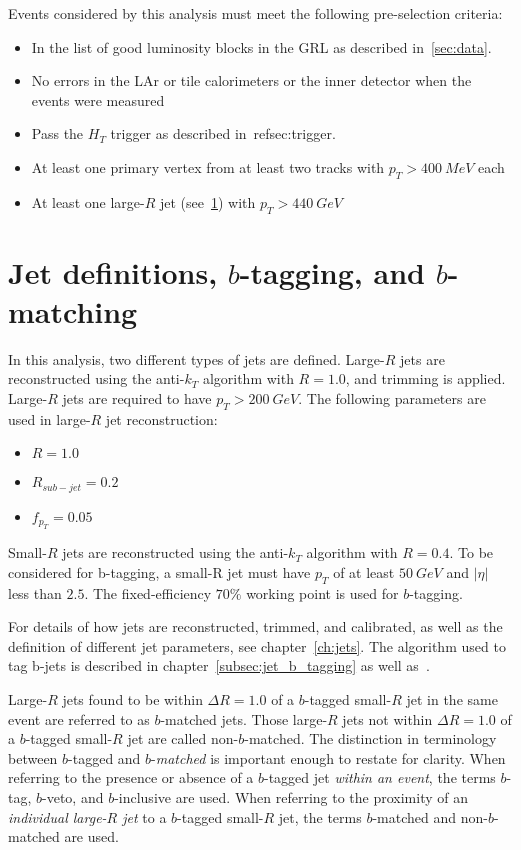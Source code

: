 Events considered by this analysis must meet the following pre-selection criteria:

\begin{itemize}
    \item In the list of good luminosity blocks in the GRL as described in~\ref{sec:data}.
    \item No errors in the LAr or tile calorimeters or the inner detector when the events were measured
    \item Pass the $H_{T}$ trigger as described in~ref{sec:trigger}.
    \item At least one primary vertex from at least two tracks with $p_{T}>400~MeV$ each
    \item At least one large-$R$ jet (see~\ref{sec:jet_definitions}) with $p_{T}>440~GeV$
\end{itemize}

\section{Jet definitions, $b$-tagging, and $b$-matching}\label{sec:jet_definitions}

In this analysis, two different types of jets are defined.
Large-$R$ jets are reconstructed using the anti-$k_{T}$ algorithm with $R=1.0$, and trimming is applied.
Large-$R$ jets are required to have $p_{T}>200~GeV$.
The following parameters are used in large-$R$ jet reconstruction:

\begin{itemize}
    \item $R=1.0$
    \item $R_{sub-jet}=0.2$
    \item $f_{p_{T}}=0.05$
\end{itemize}

Small-$R$ jets are reconstructed using the anti-$k_{T}$ algorithm with $R=0.4$.
To be considered for b-tagging, a small-R jet must have $p_{T}$ of at least $50~GeV$ and $|\eta|$ less than $2.5$.
The fixed-efficiency $70\%$ working point is used for $b$-tagging.

For details of how jets are reconstructed, trimmed, and calibrated, as well as the definition of different jet parameters, see chapter~\ref{ch:jets}.
The algorithm used to tag b-jets is described in chapter~\ref{subsec:jet_b_tagging} as well as~\cite{b-jet-perf-1,b-jet-perf-2}.

Large-$R$ jets found to be within $\Delta R=1.0$ of a $b$-tagged small-$R$ jet in the same event are referred to as $b$-matched jets.
Those large-$R$ jets not within $\Delta R=1.0$ of a $b$-tagged small-$R$ jet are called non-$b$-matched.
The distinction in terminology between $b$-tagged and $b$-\textit{matched} is important enough to restate for clarity.
When referring to the presence or absence of a $b$-tagged jet \textit{within an event}, the terms $b$-tag, $b$-veto, and $b$-inclusive are used.
When referring to the proximity of an \textit{individual large-$R$ jet} to a $b$-tagged small-$R$ jet, the terms $b$-matched and non-$b$-matched are used.

